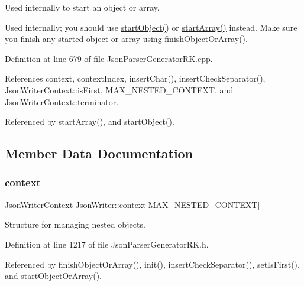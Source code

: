 Used internally to start an object or array. 

Used internally; you should use \hyperlink{class_json_writer_a43d1a78bf211a2f12cfe9253462717ae}{start\+Object()} or \hyperlink{class_json_writer_a7ccfcbf66a8ed9a2728e6f6ae4b705ec}{start\+Array()} instead. Make sure you finish any started object or array using \hyperlink{class_json_writer_adbd96b46b0679bea3a066c0e62bd86b0}{finish\+Object\+Or\+Array()}. 

Definition at line 679 of file Json\+Parser\+Generator\+R\+K.\+cpp.



References context, context\+Index, insert\+Char(), insert\+Check\+Separator(), Json\+Writer\+Context\+::is\+First, M\+A\+X\+\_\+\+N\+E\+S\+T\+E\+D\+\_\+\+C\+O\+N\+T\+E\+XT, and Json\+Writer\+Context\+::terminator.



Referenced by start\+Array(), and start\+Object().



\subsection{Member Data Documentation}
\mbox{\label{class_json_writer_a2311bf4f11136f55acd23fb13b4b1344}} 
\subsubsection{\texorpdfstring{context}{context}}
{\footnotesize\ttfamily \hyperlink{struct_json_writer_context}{Json\+Writer\+Context} Json\+Writer\+::context\mbox{[}\hyperlink{class_json_writer_a7d1daa126e962c611373f65d1e83e4ee}{M\+A\+X\+\_\+\+N\+E\+S\+T\+E\+D\+\_\+\+C\+O\+N\+T\+E\+XT}\mbox{]}\hspace{0.3cm}{\ttfamily [protected]}}



Structure for managing nested objects. 



Definition at line 1217 of file Json\+Parser\+Generator\+R\+K.\+h.



Referenced by finish\+Object\+Or\+Array(), init(), insert\+Check\+Separator(), set\+Is\+First(), and start\+Object\+Or\+Array().

\mbox{\label{class_json_writer_a28554227000e3a49b446e5db77f0505e}} 
